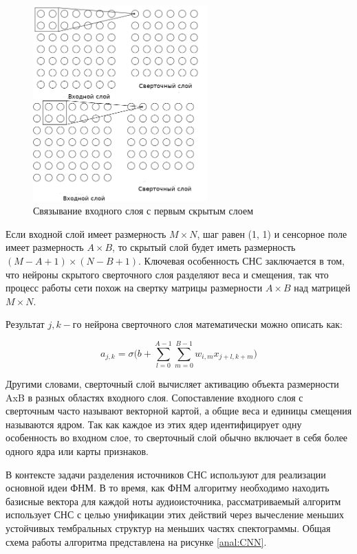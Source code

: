 \begin{figure}
	\centering
	\includegraphics[width=0.6\textwidth]{inc/img/cnn-first.png}
	\caption{Связывание входного слоя с первым скрытым слоем}
	\label{anal:CNN-first}
\end{figure}

Если входной слой имеет размерность $M \times N$, шаг равен (1, 1) и сенсорное поле имеет размерность $A \times B$, то скрытый слой будет иметь размерность $(M - A + 1) \times (N - B + 1)$. Ключевая особенность СНС заключается в том, что нейроны скрытого сверточного слоя разделяют веса и смещения, так что процесс работы сети похож на свертку матрицы размерности $A \times B$ над матрицей $M\times N$.

Результат $j,k-го$ нейрона сверточного слоя математически можно описать как:

\begin{equation}
a_{j,k} = \sigma \Bigg(b + \sum_{l=0}^{A-1} \sum_{m=0}^{B-1} w_{i,m}x_{j+l,k+m}\Bigg)
\end{equation}

Другими словами, сверточный слой вычисляет активацию объекта размерности AxB в разных областях входного слоя. Сопоставление входного слоя с сверточным часто называют векторной картой, а общие веса и единицы смещения называются ядром. Так как каждое из этих ядер идентифицирует одну особенность во входном слое, то сверточный слой обычно включает в себя более одного ядра или карты признаков.

В контексте задачи разделения источников СНС используют для реализации основной идеи ФНМ. В то время, как ФНМ алгоритму необходимо находить базисные вектора для каждой ноты аудиоисточника, рассматриваемый алгоритм использует СНС с целью унификации этих действий через вычесление меньших устойчивых тембральных структур на меньших частях спектограммы. Общая схема работы алгоритма представлена на рисунке \ref{anal:CNN}.

